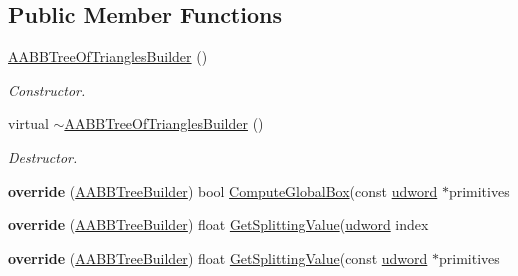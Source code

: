 \subsection*{Public Member Functions}
\begin{DoxyCompactItemize}
\item 
\hyperlink{classOpcode_1_1AABBTreeOfTrianglesBuilder_a0e0666c398e2f523c3d87549483199f9}{A\+A\+B\+B\+Tree\+Of\+Triangles\+Builder} ()\hypertarget{classOpcode_1_1AABBTreeOfTrianglesBuilder_a0e0666c398e2f523c3d87549483199f9}{}\label{classOpcode_1_1AABBTreeOfTrianglesBuilder_a0e0666c398e2f523c3d87549483199f9}

\begin{DoxyCompactList}\small\item\em Constructor. \end{DoxyCompactList}\item 
virtual \hyperlink{classOpcode_1_1AABBTreeOfTrianglesBuilder_a21713ae6879cb6dabb91bf8a493eff21}{$\sim$\+A\+A\+B\+B\+Tree\+Of\+Triangles\+Builder} ()\hypertarget{classOpcode_1_1AABBTreeOfTrianglesBuilder_a21713ae6879cb6dabb91bf8a493eff21}{}\label{classOpcode_1_1AABBTreeOfTrianglesBuilder_a21713ae6879cb6dabb91bf8a493eff21}

\begin{DoxyCompactList}\small\item\em Destructor. \end{DoxyCompactList}\item 
{\bfseries override} (\hyperlink{classOpcode_1_1AABBTreeBuilder}{A\+A\+B\+B\+Tree\+Builder}) bool \hyperlink{classOpcode_1_1AABBTreeBuilder_a7d9fe535e2dd4649b58b416e9ef63ae8}{Compute\+Global\+Box}(const \hyperlink{IceTypes_8h_a44c6f1920ba5551225fb534f9d1a1733}{udword} $\ast$primitives\hypertarget{classOpcode_1_1AABBTreeOfTrianglesBuilder_a78edec38d84ff5fe1baf08fc01c3f1ba}{}\label{classOpcode_1_1AABBTreeOfTrianglesBuilder_a78edec38d84ff5fe1baf08fc01c3f1ba}

\item 
{\bfseries override} (\hyperlink{classOpcode_1_1AABBTreeBuilder}{A\+A\+B\+B\+Tree\+Builder}) float \hyperlink{classOpcode_1_1AABBTreeBuilder_ab98a8fb0617c8ec21eadc51c9ff593d4}{Get\+Splitting\+Value}(\hyperlink{IceTypes_8h_a44c6f1920ba5551225fb534f9d1a1733}{udword} index\hypertarget{classOpcode_1_1AABBTreeOfTrianglesBuilder_a55b38e8931f0b26d6cc8c4b453b07982}{}\label{classOpcode_1_1AABBTreeOfTrianglesBuilder_a55b38e8931f0b26d6cc8c4b453b07982}

\item 
{\bfseries override} (\hyperlink{classOpcode_1_1AABBTreeBuilder}{A\+A\+B\+B\+Tree\+Builder}) float \hyperlink{classOpcode_1_1AABBTreeBuilder_ab98a8fb0617c8ec21eadc51c9ff593d4}{Get\+Splitting\+Value}(const \hyperlink{IceTypes_8h_a44c6f1920ba5551225fb534f9d1a1733}{udword} $\ast$primitives\hypertarget{classOpcode_1_1AABBTreeOfTrianglesBuilder_a65c96bc91c05eecca43051633186f0e1}{}\label{classOpcode_1_1AABBTreeOfTrianglesBuilder_a65c96bc91c05eecca43051633186f0e1}

\end{DoxyCompactItemize}
